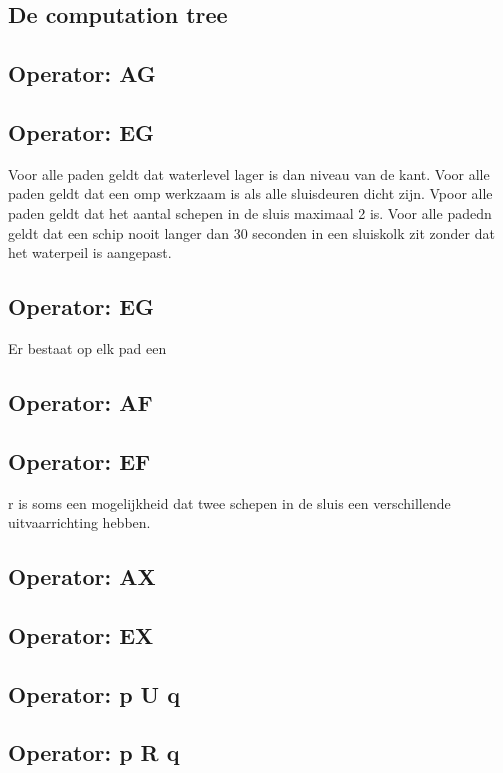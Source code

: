 \documentclass{article}
\begin{document}
	\subsection{De computation tree}
	
	\subsection{Operator: AG}

	\subsection{Operator: EG}
	

	Voor alle paden geldt dat waterlevel lager is dan niveau van de kant.
	Voor alle paden geldt dat een omp werkzaam is als alle sluisdeuren dicht zijn.
	Vpoor alle paden geldt dat het aantal schepen in de sluis maximaal 2 is.
	Voor alle padedn  geldt dat een schip nooit langer dan 30 seconden in een sluiskolk zit zonder dat het waterpeil is aangepast.
	\subsection{Operator: EG}
	Er bestaat op elk pad een 

	\subsection{Operator: AF}
	
	\subsection{Operator: EF}
	r is soms een mogelijkheid dat twee schepen in de sluis een verschillende uitvaarrichting hebben.
	\subsection{Operator: AX}

	
	\subsection{Operator: EX}
	
	\subsection{Operator: p U q}
	
	\subsection{Operator: p R q}
	
\end{document}
